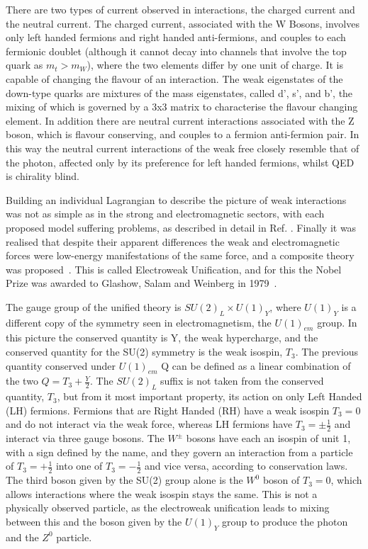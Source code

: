 There are two types of current observed in interactions, the charged current and the neutral current\cite{PichSM}. The charged current, associated with the W Bosons, involves only left handed fermions and right handed anti-fermions, and couples to each fermionic doublet (although it cannot decay into channels that involve the top quark as $m_{t} > m_{W}$), where the two elements differ by one unit of charge. It is capable of changing the flavour of an interaction. The weak eigenstates of the down-type quarks are mixtures of the mass eigenstates, called d', s', and b', the mixing of which is governed by a 3x3 matrix to characterise the flavour changing element.  In addition there are neutral current interactions associated with the Z boson, which is flavour conserving, and couples to a fermion anti-fermion pair. In this way the neutral current interactions of the weak free closely resemble that of the photon, affected only by its preference for left handed fermions, whilst QED is chirality blind. 

Building an individual Lagrangian to describe the picture of weak interactions was not as simple as in the strong and electromagnetic sectors, with each proposed model suffering problems, as described in detail in Ref. \cite{HerreroSM}. Finally it was realised that despite their apparent differences the weak and electromagnetic forces were low-energy manifestations of the same force, and a composite theory was proposed~\cite{Glashow}. This is called Electroweak Unification, and for this the Nobel Prize was awarded to Glashow, Salam and Weinberg in 1979~\cite{Breaking}. 

The gauge group of the unified theory is $SU(2)_{L} \times U(1)_{Y}$, where $U(1)_{Y}$ is a different copy of the symmetry seen in electromagnetism, the $U(1)_{em}$ group. In this picture the conserved quantity is Y, the weak hypercharge, and the conserved quantity for the SU(2) symmetry is the weak isospin, $T_{3}$. The previous quantity conserved under $U(1)_{em}$ Q can be defined as a linear combination of the two $Q = T_{3} + \frac{Y}{2}$.  The $SU(2)_{L}$ suffix is not taken from the conserved quantity, $T_{3}$, but from it most important property, its action on only Left Handed (LH) fermions. Fermions that are Right Handed (RH) have a weak isospin $T_{3} = 0$ and do not interact via the weak force, whereas LH fermions have $T_{3} =  \pm \frac{1}{2}$ and interact via three gauge bosons. The $W^{\pm}$ bosons have each an isospin of unit 1, with a sign defined by the name, and they govern an interaction from a particle of $T_{3}=+\frac{1}{2}$ into one of $T_{3}=-\frac{1}{2}$ and vice versa, according to conservation laws. The third boson given by the SU(2) group alone is the $W^{0}$ boson of $T_{3}=0$, which allows interactions where the weak isospin stays the same. This is not a physically observed particle, as the electroweak unification leads to mixing between this and the boson given by the $U(1)_{Y}$ group to produce the photon and the $Z^{0}$ particle.


